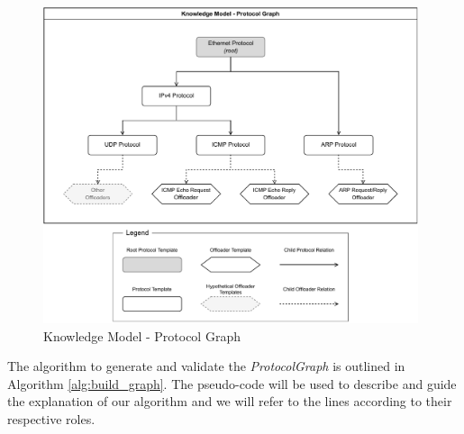 \begin{figure}[htb]
    \caption{Knowledge Model - Protocol Graph}
    \begin{center}
        \includegraphics[width=0.98\textwidth]{images/icmp_ex_protocol_graph.pdf}  
    \end{center}
    \label{fig:protocol_graph}
\end{figure}

The algorithm to generate and validate the \textit{ProtocolGraph} is outlined in Algorithm \ref{alg:build_graph}. The pseudo-code will be used to describe and guide the explanation of our algorithm and we will refer to the lines according to their respective roles.

